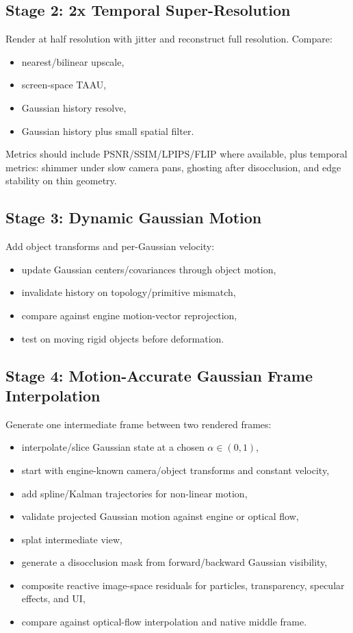 \documentclass[11pt]{article}
\begin{document}
\subsection{Stage 2: 2x Temporal Super-Resolution}

Render at half resolution with jitter and reconstruct full resolution.
Compare:

\begin{itemize}
  \item nearest/bilinear upscale,
  \item screen-space TAAU,
  \item Gaussian history resolve,
  \item Gaussian history plus small spatial filter.
\end{itemize}

Metrics should include PSNR/SSIM/LPIPS/FLIP where available, plus temporal
metrics: shimmer under slow camera pans, ghosting after disocclusion, and edge
stability on thin geometry.

\subsection{Stage 3: Dynamic Gaussian Motion}

Add object transforms and per-Gaussian velocity:

\begin{itemize}
  \item update Gaussian centers/covariances through object motion,
  \item invalidate history on topology/primitive mismatch,
  \item compare against engine motion-vector reprojection,
  \item test on moving rigid objects before deformation.
\end{itemize}

\subsection{Stage 4: Motion-Accurate Gaussian Frame Interpolation}

Generate one intermediate frame between two rendered frames:

\begin{itemize}
  \item interpolate/slice Gaussian state at a chosen $\alpha \in (0,1)$,
  \item start with engine-known camera/object transforms and constant velocity,
  \item add spline/Kalman trajectories for non-linear motion,
  \item validate projected Gaussian motion against engine or optical flow,
  \item splat intermediate view,
  \item generate a disocclusion mask from forward/backward Gaussian visibility,
  \item composite reactive image-space residuals for particles, transparency,
        specular effects, and UI,
  \item compare against optical-flow interpolation and native middle frame.
\end{itemize}
\end{document}
